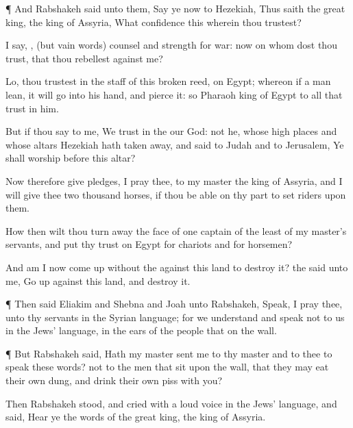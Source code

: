 {\par }{\PP {}¶ And
Rabshakeh
said unto them,
Say ye now to
Hezekiah, Thus
saith the
great
king, the
king of
Assyria, What
confidence
{} this wherein thou
trustest?

I
say,
{}, (but
{}
vain
words)
{}
counsel and
strength for
war: now on whom dost thou
trust, that thou
rebellest against me?

Lo, thou
trustest in the
staff of this
broken
reed, on
Egypt; whereon if a
man
lean, it will
go into his
hand, and
pierce it: so
{}
Pharaoh
king of
Egypt to all that
trust in him.

But if thou
say to me, We
trust in the
{} our
God:
{} not he, whose high
places and whose
altars
Hezekiah hath taken
away, and
said to
Judah and to
Jerusalem, Ye shall
worship
before this
altar?

Now therefore give
pledges, I pray thee, to my
master the
king of
Assyria, and I will
give thee two
thousand
horses, if thou be
able on thy part to
set
riders upon them.

How then wilt thou turn
away the
face of
one
captain of the
least of my
master’s
servants, and put thy
trust on
Egypt for
chariots and for
horsemen?

And am I now come
up
without the
{} against this
land to
destroy it? the
{}
said unto me, Go
up against this
land, and
destroy it.


\par }{\PP {}¶ Then
said
Eliakim and
Shebna and
Joah unto
Rabshakeh,
Speak, I pray thee, unto thy
servants in the Syrian
language; for we
understand
{} and
speak not to us in the
Jews’ language, in the
ears of the
people that
{} on the
wall.


\par }{\PP {}¶ But
Rabshakeh
said, Hath my
master
sent me to thy
master and to thee to
speak these
words?
{} not
{} to the
men that
sit upon the
wall, that they may
eat their own
dung, and
drink their own
piss with you?

Then
Rabshakeh
stood, and
cried with a
loud
voice in the
Jews’ language, and
said,
Hear ye the
words of the
great
king, the
king of
Assyria.

}
